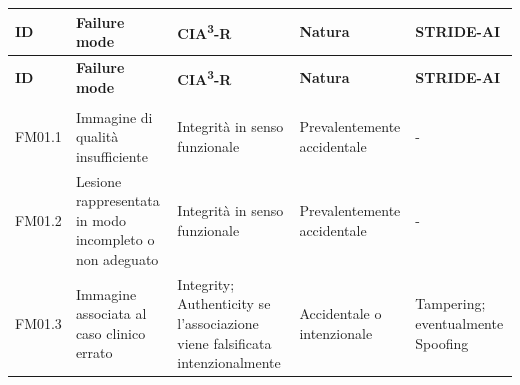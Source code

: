 {
\small
{}
\setlength{\tabcolsep}{4pt}
\renewcommand{\arraystretch}{1.08}

\begin{xltabular}{\textwidth}{
    >{\raggedright\arraybackslash}p{1.35cm}
    X
    >{\raggedright\arraybackslash}p{3.5cm}
    >{\raggedright\arraybackslash}p{2.7cm}
    >{\raggedright\arraybackslash}p{2.4cm}
}

\toprule

\textbf{ID} &
\textbf{Failure mode} &
\textbf{CIA\textsuperscript{3}-R} &
\textbf{Natura} &
\textbf{STRIDE-AI} \\

\midrule

\endfirsthead

\toprule

\textbf{ID} &
\textbf{Failure mode} &
\textbf{CIA\textsuperscript{3}-R} &
\textbf{Natura} &
\textbf{STRIDE-AI} \\

\midrule

\endhead

 \\
\endfoot

\endlastfoot


FM01.1 &

Immagine di qualità insufficiente &

Integrità in senso funzionale%
\hyperlink{nota-integrita-funzionale}{\footnotemark} &

Prevalentemente accidentale &

- \\

\midrule


FM01.2 &

Lesione rappresentata in modo incompleto o non adeguato &

Integrità in senso funzionale &

Prevalentemente accidentale &

- \\

\midrule


FM01.3 &

Immagine associata al caso clinico errato &

Integrity; Authenticity se l'associazione viene falsificata intenzionalmente &

Accidentale o intenzionale &

Tampering; eventualmente Spoofing \\


\end{xltabular}}
